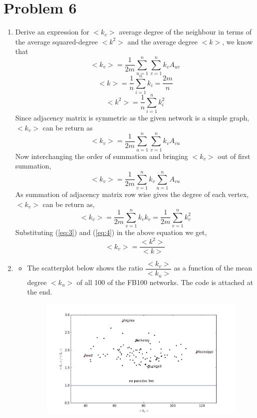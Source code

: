 \documentclass{article}
\begin{document}
\section*{Problem 6}
\begin{enumerate}[label=(\alph*)]

\item
Derive an expression for $<k_v>$ average degree of the neighbour in terms of the average squared-degree $<k^2>$ and the average degree $<k>$, we know that
$$<k_v> = \dfrac{1}{2m}\sum_{u=1}^n \sum_{v=1}^n k_v A_{uv}$$
\begin{equation} \label{eq:3}
<k> = \dfrac{1}{n} \sum_{i=1}^n k_i = \dfrac{2m}{n}
\end{equation}
\begin{equation} \label{eq:4}
<k^2> = \dfrac{1}{n} \sum_{i=1}^n k_i^2
\end{equation}
Since adjacency matrix is symmetric as the given network is a simple graph, $<k_v>$ can be return as
$$<k_v> = \dfrac{1}{2m}\sum_{u=1}^n \sum_{v=1}^n k_v A_{vu}$$
Now interchanging the order of summation and bringing $<k_v>$ out of first summation,
$$<k_v> = \dfrac{1}{2m}\sum_{v=1}^n k_v \sum_{u=1}^n A_{vu}$$
As summation of adjacency matrix row wise gives the degree of each vertex, $<k_v>$ can be return as,
$$<k_v> = \dfrac{1}{2m}\sum_{v=1}^n k_v k_v = \dfrac{1}{2m}\sum_{v=1}^n k_v^2$$
Substituting (\ref{eq:3}) and (\ref{eq:4}) in the above equation we get,
$$<k_v> = \dfrac{<k^2>}{<k>}$$

\item
\begin{itemize}
\item
The scatterplot below shows the ratio $\dfrac{<k_v>}{<k_u>}$ as a function of the mean degree $<k_u>$ of all 100 of the FB100 networks. The code is attached at the end.
\begin{figure}[!h]
  \centering
  \begin{minipage}[b]{\textwidth}
    \includegraphics[width=\textwidth]{images/6b1.png}
  \end{minipage}
\end{figure} 


\end{itemize}
\end{enumerate}
\end{document}
